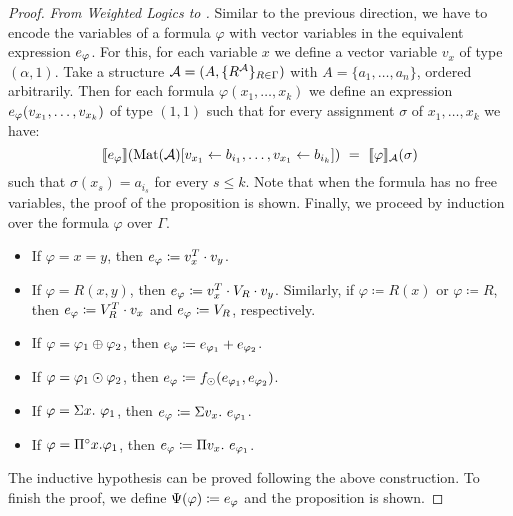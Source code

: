 \begin{proof}
\noindent \emph{From Weighted Logics to \langprod.} 
Similar to the previous direction, we have to encode the \langprod variables of a formula $\varphi$ with vector variables in the equivalent \langprod expression $e_\varphi$. For this, for each \langprod variable $x$ we define a vector variable $v_x$ of type $(\alpha, 1)$. 
Take a structure $\mathcal{A} = (A, \{R^{\mathcal{A}}\}_{R \in \Gamma})$ with $A = \{a_1, \ldots, a_n\}$, ordered arbitrarily.
Then for each formula $\varphi(x_1, \ldots, x_k)$ we define an expression $e_\varphi(v_{x_1}, \ldots, v_{x_k})$ of type $(1,1)$ such that for every assignment $\sigma$ of $x_1, \ldots, x_k$ we have:
$$
\sem{\evarphi}{\text{Mat}(\cA)[v_{x_1} \gets b_{i_1},\ldots,v_{x_1}\gets b_{i_k}]} \ = \ \ssem{\varphi}{\cA}(\sigma) 
$$
such that $\sigma(x_{s}) = a_{i_s}$ for every $s \leq k$. Note that when the formula has no free variables, the proof of the proposition is shown. Finally, we proceed by induction over the formula $\varphi$ over $\Gamma$.
\begin{itemize} \itemsep3mm
  \item If $\varphi=x=y$, then $e_\varphi\coloneqq  v_x^T \cdot v_{y}$.
  \item If $\varphi=R(x,y)$, then $e_\varphi\coloneqq v_x^T \cdot V_R \cdot v_{y}$. Similarly, if $\varphi\coloneqq R(x)$ or $\varphi\coloneqq R$, then $e_\varphi\coloneqq  V_R^T \cdot v_{x}$  and $e_\varphi\coloneqq  V_R$, respectively. 
  \item If $\varphi = \varphi_1 \oplus \varphi_2$, then $e_\varphi\coloneqq  e_{\varphi_1} + e_{\varphi_2}$.
  \item If $\varphi = \varphi_1 \odot \varphi_2$, then $e_\varphi\coloneqq  f_\odot(e_{\varphi_1},e_{\varphi_2})$.
  \item If $\varphi = \Sigma x.\  \varphi_1$, then $e_\varphi \coloneqq \Sigma v_x.\ e_{\varphi_1}$.
  \item If $\varphi = \Pi^{\circ} x. \varphi_1$, then $e_\varphi \coloneqq  \Pi v_x.\ e_{\varphi_1}$.
\end{itemize}
The inductive hypothesis can be proved following the above construction. To finish the proof, we define $\Psi(\varphi) \coloneqq  e_\varphi$ and the proposition is shown.
\end{proof}
